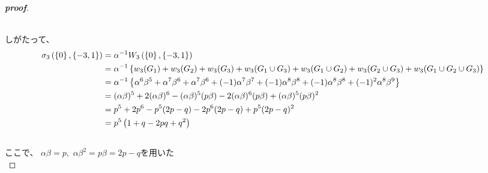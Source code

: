 \documentclass[dvipdfmx]{jsarticle} %
\begin{document}
\begin{proof}[\textbf{proof}]
\begin{figure}[htbp]
\begin{tikzpicture}
\end{tikzpicture}
\end{figure}
\ \\
しがたって、\\


\begin{align*}
  \sigma_3 \left(\left\{0\right\}, \left\{-3,1\right\}\right) &= \alpha^{-1} W_3 \left(\left\{0\right\},\left\{-3,1\right\}\right)\\ \notag
  &= \alpha^{-1}\left\{w_3(G_1)+w_3(G_2)+w_3(G_3)+w_3(G_1\cup G_3)+w_3(G_1\cup G_2)+w_3(G_2\cup G_3)+w_3(G_1\cup G_2\cup G_3)\right\} \\ \notag
  &= \alpha^{-1}\left\{\alpha^6 \beta^5+\alpha^7\beta^6+\alpha^7\beta^6+(-1)\alpha^7 \beta^7+(-1)\alpha^8 \beta^8+(-1)\alpha^8 \beta^8+(-1)^2\alpha^8 \beta^9\right\} \\ \notag
  &=(\alpha \beta)^5+2(\alpha \beta)^6-(\alpha \beta)^5(p \beta)-2(\alpha \beta)^6(p \beta)+(\alpha \beta)^5(p \beta)^2 \\ \notag
  &=p^5+2p^6-p^5(2p-q)-2p^6(2p-q)+p^5(2p-q)^2 \\ \notag
  &=p^5\left(1+q-2pq+q^2\right)\\ \notag
\end{align*}
ここで、 $ \alpha \beta=p $,\  $ \alpha \beta^2 =p \beta=2p-q $を用いた\\

\end{proof}
\end{document}
